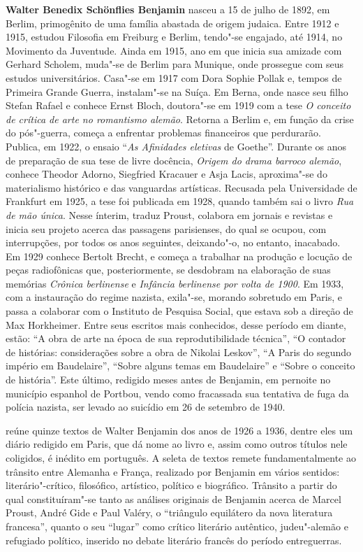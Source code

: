 
\textbf{Walter Benedix Schönflies Benjamin} nasceu a 15 de julho de 1892, em Berlim,
primogênito de uma família abastada de origem judaica. Entre 1912 e 1915, estudou Filosofia
em Freiburg e Berlim, tendo"-se engajado, até 1914, no Movimento da Juventude. Ainda em
1915, ano em que inicia sua amizade com Gerhard Scholem, muda"-se de Berlim para
Munique, onde prossegue com seus estudos universitários. Casa"-se em 1917 com Dora
Sophie Pollak e, tempos de Primeira Grande Guerra, instalam"-se na Suíça. Em Berna, onde nasce seu filho Stefan
Rafael e conhece Ernst Bloch, doutora"-se em 1919 com a tese \emph{O conceito de crítica de
arte no romantismo alemão}. Retorna a Berlim e, em função da crise do pós"-guerra, começa a
enfrentar problemas financeiros que perdurarão. Publica, em 1922, o ensaio ``\emph{As Afinidades
eletivas} de Goethe''. Durante os anos de preparação de sua tese de livre docência, \emph{Origem do
drama barroco alemão}, conhece Theodor Adorno, Siegfried Kracauer e Asja Lacis, aproxima"-se do materialismo histórico e das vanguardas artísticas. Recusada pela Universidade de
Frankfurt em 1925, a tese foi publicada em 1928, quando também sai o livro \emph{Rua de mão única}.
Nesse ínterim, traduz Proust, colabora em jornais e revistas e inicia seu projeto acerca das
passagens parisienses, do qual se ocupou, com interrupções, por todos os anos seguintes,
deixando"-o, no entanto, inacabado. Em 1929 conhece Bertolt Brecht, e começa a trabalhar na
produção e locução de peças radiofônicas que, posteriormente, se desdobram na elaboração de
suas memórias \emph{Crônica berlinense} e \emph{Infância berlinense por volta de 1900}. Em 1933, com a
instauração do regime nazista, exila"-se, morando sobretudo em Paris, e passa a colaborar com o
Instituto de Pesquisa Social, que estava sob a direção de Max Horkheimer. Entre seus escritos
mais conhecidos, desse período em diante, estão: ``A obra de arte na época de sua
reprodutibilidade técnica'', ``O contador de histórias: considerações sobre a obra de Nikolai
Leskov'', ``A Paris do segundo império em Baudelaire'', ``Sobre alguns temas em Baudelaire'' e
``Sobre o conceito de história''. Este último, redigido meses antes de Benjamin, em
pernoite no município espanhol de Portbou, vendo como fracassada sua tentativa de fuga
da polícia nazista, ser levado ao suicídio em 26 de setembro de 1940.

\textbf{\titulo} reúne quinze textos de Walter Benjamin dos anos de 1926 a 1936, dentre eles um diário redigido em Paris, que dá nome ao livro e, assim como outros títulos nele coligidos, é inédito em português. A seleta de textos remete fundamentalmente ao trânsito entre Alemanha e França, realizado por Benjamin em vários sentidos: literário"-crítico, filosófico, artístico, político e biográfico. Trânsito a partir do qual constituíram"-se tanto as análises originais de Benjamin acerca de Marcel Proust, André Gide e Paul Valéry, o ``triângulo equilátero da nova literatura francesa'', quanto o seu ``lugar'' como crítico literário autêntico, judeu"-alemão e refugiado político, inserido no debate literário francês do período entreguerras.

